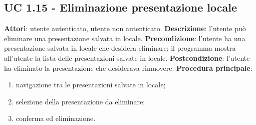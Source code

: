 \subsection{UC 1.15 - Eliminazione presentazione locale}{
	\label{uc1.15}
	\textbf{Attori}: utente autenticato, utente non autenticato.
	\textbf{Descrizione}: l'utente può eliminare una presentazione salvata in locale.
	\textbf{Precondizione}: l'utente ha una presentazione salvata in locale che desidera eliminare; il programma mostra all'utente la lista delle presentazioni salvate in locale.
	\textbf{Postcondizione}: l'utente ha eliminato la presentazione che desiderava rimuovere.
	\textbf{Procedura principale}:
	\begin{enumerate}
		\item navigazione tra le presentazioni salvate in locale;
		\item selezione della presentazione da eliminare;
		\item conferma ed eliminazione.
	\end{enumerate}
}
